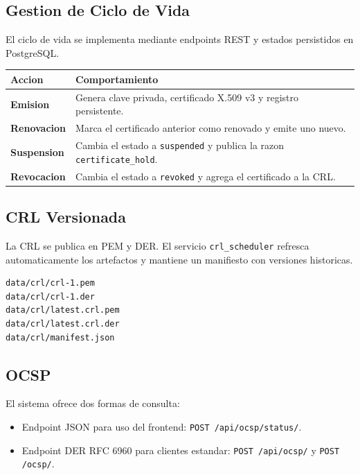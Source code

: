 \documentclass[12pt,a4paper]{article}
\begin{document}
\subsection{Gestion de Ciclo de Vida}

El ciclo de vida se implementa mediante endpoints REST y estados persistidos en PostgreSQL.

\begin{longtable}{>{\bfseries}p{3.5cm}p{10.5cm}}
\toprule
Accion & Comportamiento \\
\midrule
Emision & Genera clave privada, certificado X.509 v3 y registro persistente. \\
Renovacion & Marca el certificado anterior como renovado y emite uno nuevo. \\
Suspension & Cambia el estado a \texttt{suspended} y publica la razon \texttt{certificate\_hold}. \\
Revocacion & Cambia el estado a \texttt{revoked} y agrega el certificado a la CRL. \\
\bottomrule
\end{longtable}

\subsection{CRL Versionada}

La CRL se publica en PEM y DER. El servicio \texttt{crl\_scheduler} refresca automaticamente los artefactos y mantiene un manifiesto con versiones historicas.

\begin{lstlisting}[style=code]
data/crl/crl-1.pem
data/crl/crl-1.der
data/crl/latest.crl.pem
data/crl/latest.crl.der
data/crl/manifest.json
\end{lstlisting}

\subsection{OCSP}

El sistema ofrece dos formas de consulta:

\begin{itemize}[leftmargin=*]
    \item Endpoint JSON para uso del frontend: \texttt{POST /api/ocsp/status/}.
    \item Endpoint DER RFC 6960 para clientes estandar: \texttt{POST /api/ocsp/} y \texttt{POST /ocsp/}.
\end{itemize}
\end{document}

